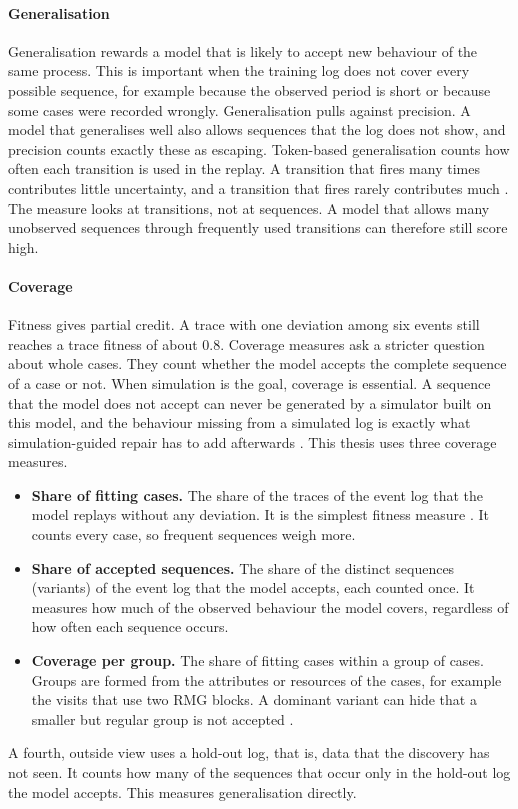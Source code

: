 \paragraph{Generalisation}
Generalisation rewards a model that is likely to accept new behaviour of the
same process. This is important when the training log does not cover every
possible sequence, for example because the observed period is short or because
some cases were recorded wrongly. Generalisation pulls against precision. A model
that generalises well also allows sequences that the log does not show, and
precision counts exactly these as escaping. Token-based generalisation counts how
often each transition is used in the replay. A transition that fires many times
contributes little uncertainty, and a transition that fires rarely contributes
much \cite{Buijs2014Quality}. The measure looks at transitions, not at
sequences. A model that allows many unobserved sequences through frequently used
transitions can therefore still score high.

\paragraph{Coverage}
\label{sec:bg_coverage}
Fitness gives partial credit. A trace with one deviation among six events still
reaches a trace fitness of about 0.8. Coverage measures ask a stricter question
about whole cases. They count whether the model accepts the complete sequence of
a case or not. When simulation is the goal, coverage is essential. A sequence
that the model does not accept can never be generated by a simulator built on
this model, and the behaviour missing from a simulated log is exactly what
simulation-guided repair has to add afterwards \cite{SimulationGuidedRepair2025}.
This thesis uses three coverage measures.
\begin{itemize}[itemsep=1pt,topsep=3pt]
\item \textbf{Share of fitting cases.} The share of the traces of the event log
that the model replays without any deviation. It is the simplest fitness measure
\cite{Aalst2016}. It counts every case, so frequent sequences weigh more.
\item \textbf{Share of accepted sequences.} The share of the distinct sequences
(variants) of the event log that the model accepts, each counted once. It
measures how much of the observed behaviour the model covers, regardless of how
often each sequence occurs.
\item \textbf{Coverage per group.} The share of fitting cases within a group of
cases. Groups are formed from the attributes or resources of the cases, for
example the visits that use two RMG blocks. A dominant variant can hide that a
smaller but regular group is not accepted \cite{RWNorouzifar2026Rules}.
\end{itemize}
A fourth, outside view uses a hold-out log, that is, data that the discovery has
not seen. It counts how many of the sequences that occur only in the hold-out log
the model accepts. This measures generalisation directly.

